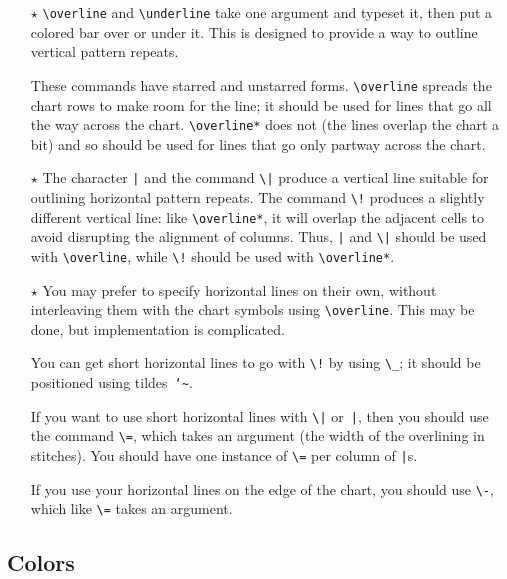 \documentclass[draft]{amsart}
\begin{document}
\begin{itemize}

\item[$\star$] \verb|\overline| and \verb|\underline| take one argument and typeset it, then put a colored bar over or under it. This is designed to provide a way to outline vertical pattern repeats.

These commands have starred and unstarred forms. \verb|\overline| spreads the chart rows to make room for the line; it should be used for lines that go all the way across the chart. \verb|\overline*| does not (the lines overlap the chart a bit) and so should be used for lines that go only partway across the chart.

\item[$\star$] The character \texttt{|} and the command \verb?\|? produce a vertical line suitable for outlining horizontal pattern repeats. The command \verb?\!? produces a slightly different vertical line: like \verb|\overline*|, it will overlap the adjacent cells to avoid disrupting the alignment of columns. Thus, \texttt{|} and \verb?\|? should be used with \verb|\overline|, while \verb|\!| should be used with \verb|\overline*|.

\item[$\star$] You may prefer to specify horizontal lines on their own, without interleaving them with the chart symbols using \verb|\overline|. This may be done, but implementation is complicated.

You can get short horizontal lines to go with \verb?\!? by using \verb|\_|; it should be positioned using tildes~\texttt{\char`\~}. 

If you want to use short horizontal lines with \verb?\|? or~\verb?|?, then you should use the command \verb|\=|, which takes an argument (the width of the overlining in stitches). You should have one instance of \verb|\=| per column of \verb?|?s. 

If you use your horizontal lines on the edge of the chart, you should use \verb|\-|, which like \verb|\=| takes an argument.

\end{itemize}

\subsection{Colors}
\end{document}
